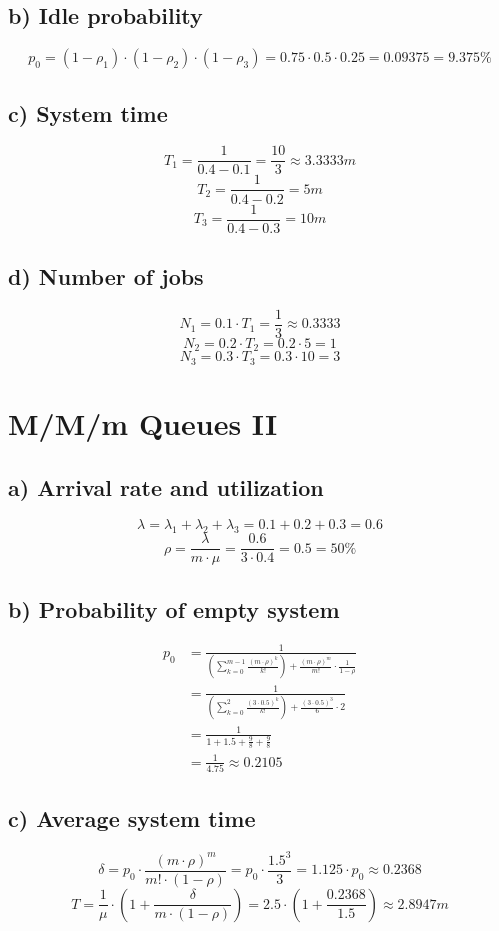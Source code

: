 \documentclass[a4paper, 11 pt, article, accentcolor=tud7b]{tudreport}
\begin{document}
	\subsection*{b) Idle probability}
	$$p_{0} = (1-\rho_{1}) \cdot (1-\rho_{2}) \cdot (1-\rho_{3}) = 0.75 \cdot 0.5 \cdot 0.25 = 0.09375 = 9.375\%$$
	
	\subsection*{c) System time}
	$$T_{1} = \frac{1}{0.4 - 0.1} = \frac{10}{3} \approx 3.3333m$$
	$$T_{2} = \frac{1}{0.4 - 0.2} = 5m$$
	$$T_{3} = \frac{1}{0.4 - 0.3} = 10m$$
	
	\subsection*{d) Number of jobs}
  $$N_{1} = 0.1 \cdot T_{1} = \frac{1}{3} \approx 0.3333$$
	$$N_{2} = 0.2 \cdot T_{2} = 0.2 \cdot 5 = 1$$
	$$N_{3} = 0.3 \cdot T_{3} = 0.3 \cdot 10 = 3$$
	
	\section{M/M/m Queues II}
	
	\subsection*{a) Arrival rate and utilization}
	$$\lambda = \lambda_{1} + \lambda_{2} + \lambda_{3} = 0.1 + 0.2 + 0.3 = 0.6$$
	$$\rho = \frac{\lambda}{m \cdot \mu} = \frac{0.6}{3 \cdot 0.4} = 0.5 = 50\%$$
	
	\subsection*{b) Probability of empty system}
	\begin{align*}
	  p_{0} &= \frac{1}{(\sum_{k=0}^{m-1} \frac{(m \cdot \rho)^{k}}{k!}) + \frac{(m \cdot \rho)^{m}}{m!} \cdot \frac{1}{1 - \rho}} \\
	        &= \frac{1}{(\sum_{k=0}^{2} \frac{(3 \cdot 0.5)^{k}}{k!}) + \frac{(3 \cdot 0.5)^{3}}{6} \cdot 2} \\
	        &= \frac{1}{1 + 1.5 + \frac{9}{8} + \frac{9}{8}} \\
	        &= \frac{1}{4.75} \approx 0.2105
	\end{align*}
	
	\subsection*{c) Average system time}
	$$\delta = p_{0} \cdot \frac{(m \cdot \rho)^{m}}{m! \cdot (1-\rho)} = p_{0} \cdot \frac{1.5^3}{3} = 1.125 \cdot p_{0} \approx 0.2368 $$
	$$ T = \frac{1}{\mu} \cdot (1 + \frac{\delta}{m \cdot (1-\rho)}) = 2.5 \cdot (1 + \frac{0.2368}{1.5}) \approx 2.8947m$$
	
\end{document}
